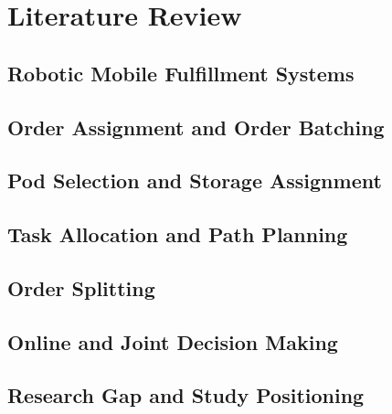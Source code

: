 %
%
%

\chapter{Literature Review}
\label{ch:lit}

\section{Robotic Mobile Fulfillment Systems}
\label{sec:lit-rmfs}

\section{Order Assignment and Order Batching}
\label{sec:lit-oa}

\section{Pod Selection and Storage Assignment}
\label{sec:lit-ps}

\section{Task Allocation and Path Planning}
\label{sec:lit-ta}

\section{Order Splitting}
\label{sec:lit-split}

\section{Online and Joint Decision Making}
\label{sec:lit-online}

\section{Research Gap and Study Positioning}
\label{sec:lit-gap}

